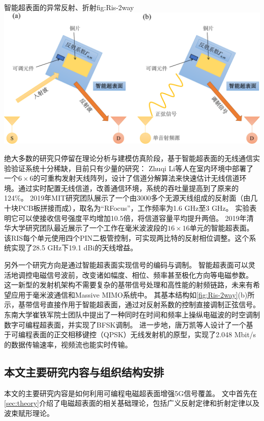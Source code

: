 \documentclass[supercite]{HustGraduPaper}
\begin{document}
\begin{generalfig}[htb]{智能超表面的异常反射、折射}{fig:Ris-2way}
	\includegraphics[width=0.8\linewidth]{Figures/Ris-2way.pdf}
\end{generalfig}

绝大多数的研究只停留在理论分析与建模仿真阶段，基于智能超表面的无线通信实验验证系统十分稀缺，目前只有少量的研究：
Zhuqi Li等人在室内环境中部署了一个$ 6 \times 6 $的可重构发射天线阵列，设计了信道分解算法来快速估计无线信道环境\cite{li2019towards}。通过实时配置无线信道，改善通信环境，系统的吞吐量提高到了原来的124\%。
2019年MIT研究团队展示了一个由3000多个无源天线组成的反射面（由几十块PCB板拼接而成），取名为“RFocus”，工作频率为1.6 GHz至3 GHz。
实验表明它可以使接收信号强度平均增加10.5倍，将信道容量平均提升两倍\cite{arun2019rfocus}。
2019年清华大学研究团队最近展示了一个工作在毫米波波段的$ 16 \times 16 $单元的智能超表面。
该RIS每个单元使用四个PIN二极管控制，可实现两比特的反射相位调整。这个系统实现了28.5 GHz下19.1 dBi的天线增益\cite{Dai2020}。

另外一个研究方向是通过智能超表面实现信号的编码与调制。
智能超表面可以灵活地调控电磁信号波前，改变诸如幅度、相位、频率甚至极化方向等电磁参数\cite{CHN_zhou2020}。
这一新型的发射机架构不需要复杂的基带信号处理和高性能的射频链路，未来有希望应用于毫米波通信和Massive MIMO系统中。
其基本结构如\autoref{fig:Ris-2way}(b)所示，基带信号直接作用于智能超表面，通过对反射系数的控制直接调制正弦信号。
东南大学崔铁军院士团队中提出了一种同时在时间和频率上操纵电磁波的时空调制数字可编程超表面，并实现了BFSK调制\cite{zhao2019programmable}。
进一步地，唐万凯等人设计了一个基于可编程表面的正交相移键控（QPSK）无线发射机的原型，实现了2.048 Mbit/s的数据传输速率，视频流也能实时传输\cite{Tang2019Wireless}。

\subsection{本文主要研究内容与组织结构安排}

本文的主要研究内容是如何利用可编程电磁超表面增强5G信号覆盖。
文中首先在\autoref{sec:theory}介绍了电磁超表面的相关基础理论，包括广义反射定律和折射定律以及波束赋形理论。
\end{document}
